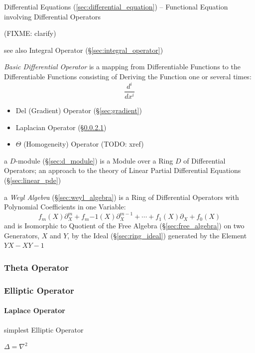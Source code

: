 {Differential Equations (\ref{sec:differential_equation}) -- Functional Equation
involving Differential Operators

(FIXME: clarify)

\fist see also Integral Operator (\S\ref{sec:integral_operator})

\emph{Basic Differential Operator} is a mapping from Differentiable Functions
to the Differentiable Functions consisting of Deriving the Function one or
several times:
\[
  \frac{d^i}{dx^i}
\]

\begin{itemize}
  \item Del (Gradient) Operator (\S\ref{sec:gradient})
  \item Laplacian Operator (\S\ref{sec:laplace_operator})
  \item $\Theta$ (Homogeneity) Operator (TODO: xref)
\end{itemize}

\fist a $D$-module (\S\ref{sec:d_module}) is a Module over a Ring $D$ of
Differential Operators; an approach to the theory of Linear Partial Differential
Equations (\S\ref{sec:linear_pde})

\fist a \emph{Weyl Algebra} (\S\ref{sec:weyl_algebra}) is a Ring of
Differential Operators with Polynomial Coefficients in one Variable:
\[
  f_m(X)\partial^m_X + f_m{-1}(X)\partial^{m-1}_X + \cdots +
    f_1(X)\partial_X + f_0(X)
\]
and is Isomorphic to Quotient of the Free Algebra (\S\ref{sec:free_algebra}) on
two Generators, $X$ and $Y$, by the Ideal (\S\ref{sec:ring_ideal}) generated by
the Element $YX - XY - 1$



\subsubsection{Theta Operator}\label{sec:theta_operator}

\subsubsection{Elliptic Operator}\label{sec:elliptic_operator}

\paragraph{Laplace Operator}\label{sec:laplace_operator}\hfill

simplest Elliptic Operator

$\Delta = \nabla^2$

}
